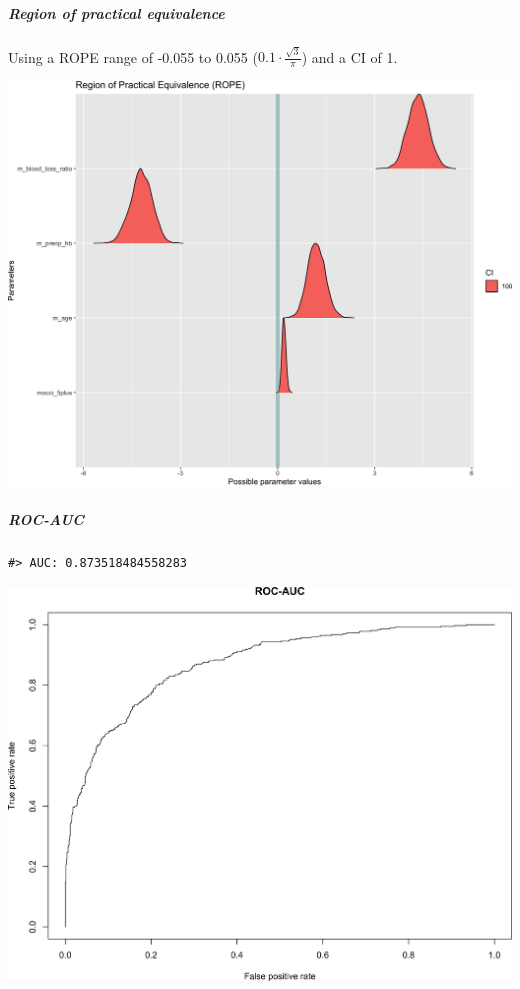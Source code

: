 \documentclass[
]{article}
\begin{document}
\hypertarget{region-of-practical-equivalence-1}{%
\subparagraph{Region of practical equivalence}\label{region-of-practical-equivalence-1}}

Using a ROPE range of -0.055 to 0.055 (\(0.1 \cdot \frac{\sqrt{3}}{\pi}\)) and a CI of 1.

\begin{center}\includegraphics[width=1\linewidth]{notebook_files/figure-latex/model1reduced_rope-1} \end{center}

\hypertarget{roc-auc-1}{%
\subparagraph{ROC-AUC}\label{roc-auc-1}}

\begin{verbatim}
#> AUC: 0.873518484558283
\end{verbatim}

\begin{center}\includegraphics[width=1\linewidth]{notebook_files/figure-latex/model1reduced_rocauc-1} \end{center}
\end{document}
